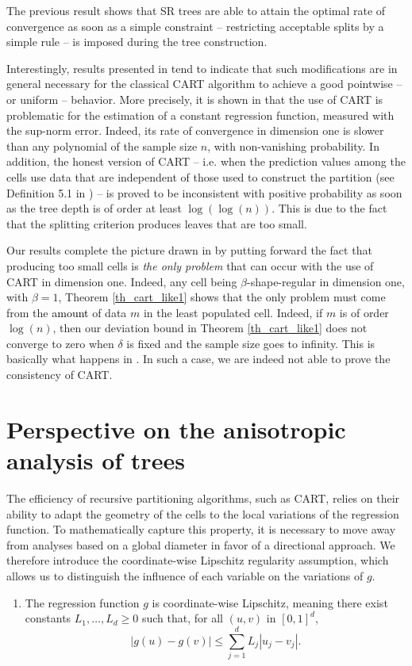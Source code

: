 \documentclass[paper=a4, fontsize=11pt]{scrartcl}
\newcommand{\rev}[1]{\textcolor{black}{#1}}
\begin{document}
The previous result shows that SR trees are able to attain the optimal rate of convergence as soon as a simple constraint -- restricting acceptable splits by a simple rule -- is imposed during the tree construction. 

Interestingly, results presented in \cite{cattaneo2022pointwise} tend to indicate that such modifications are in general necessary for the classical CART algorithm to achieve a good pointwise -- or uniform -- behavior. More precisely, it is shown in \cite{cattaneo2022pointwise} that the use of CART is problematic for the estimation of a constant regression function,  measured with the sup-norm error. Indeed, its rate of convergence in dimension one is slower than any polynomial of the sample size $n$, with non-vanishing probability. In addition, the honest version of CART -- i.e. when the prediction values among the cells use data that are independent of those used to construct the partition (see Definition 5.1 in \cite{cattaneo2022pointwise}) -- is proved to be inconsistent with positive probability as soon as the tree depth is of order at least $\log(\log(n))$.  This is due to the fact that the splitting criterion produces leaves that are too small.  

Our results complete the picture drawn in \cite{cattaneo2022pointwise} by putting forward the fact that producing too small cells is \textit{the only problem} that can occur with the use of CART in dimension one. Indeed, any cell being $\beta$-shape-regular in dimension one, with $\beta=1$, Theorem \ref{th_cart_like1} shows that the only problem must come from the \rev{amount} of data $m$ in the least populated cell. Indeed, if $m$ is of order $\log(n)$, then our deviation bound in Theorem \ref{th_cart_like1} does not converge to zero when $\delta$ is fixed and the sample size goes to infinity. This is basically what happens in \cite{cattaneo2022pointwise}. In such a case, we are indeed not able to prove the consistency of CART. 


\section{Perspective on the anisotropic analysis of trees}\label{sec:perspective}


The efficiency of recursive partitioning algorithms, such as CART, relies on their ability to adapt the geometry of the cells to the local variations of the regression function. To mathematically capture this property, it is necessary to move away from analyses based on a global diameter in favor of a directional approach. We therefore introduce the coordinate-wise Lipschitz regularity assumption, which allows us to distinguish the influence of each variable on the variations of $g$.
\begin{enumerate}[label=(CL), wide=0.5em, leftmargin=*]
\item \label{cond:lip_direc} The regression function $g$ is coordinate-wise Lipschitz, meaning there exist constants $L_1, \dots, L_d \geq 0$ such that, for all $(u, v)$ in $ [0,1]^d$, $$|g(u) - g(v)| \leq \sum_{j=1}^d L_j |u_j - v_j|.$$
\end{enumerate}
\end{document}

